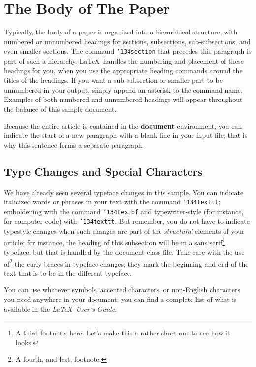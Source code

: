\documentclass{acm_proc_article-sp}
\begin{document}
\section{The {\secit Body} of The Paper}
Typically, the body of a paper is organized
into a hierarchical structure, with numbered or unnumbered
headings for sections, subsections, sub-subsections, and even
smaller sections.  The command \texttt{{\char'134}section} that
precedes this paragraph is part of such a
hierarchy.
\LaTeX\ handles the numbering
and placement of these headings for you, when you use
the appropriate heading commands around the titles
of the headings.  If you want a sub-subsection or
smaller part to be unnumbered in your output, simply append an
asterisk to the command name.  Examples of both
numbered and unnumbered headings will appear throughout the
balance of this sample document.

Because the entire article is contained in
the \textbf{document} environment, you can indicate the
start of a new paragraph with a blank line in your
input file; that is why this sentence forms a separate paragraph.

\subsection{Type Changes and {\subsecit Special} Characters}
We have already seen several typeface changes in this sample.  You
can indicate italicized words or phrases in your text with
the command \texttt{{\char'134}textit}; emboldening with the
command \texttt{{\char'134}textbf}
and typewriter-style (for instance, for computer code) with
\texttt{{\char'134}texttt}.  But remember, you do not
have to indicate typestyle changes when such changes are
part of the \textit{structural} elements of your
article; for instance, the heading of this subsection will
be in a sans serif\footnote{A third footnote, here.
Let's make this a rather short one to
see how it looks.} typeface, but that is handled by the
document class file. Take care with the use
of\footnote{A fourth, and last, footnote.}
the curly braces in typeface changes; they mark
the beginning and end of
the text that is to be in the different typeface.

You can use whatever symbols, accented characters, or
non-English characters you need anywhere in your document;
you can find a complete list of what is
available in the \textit{\LaTeX\
User's Guide}\cite{Lamport:LaTeX}.
\end{document}
